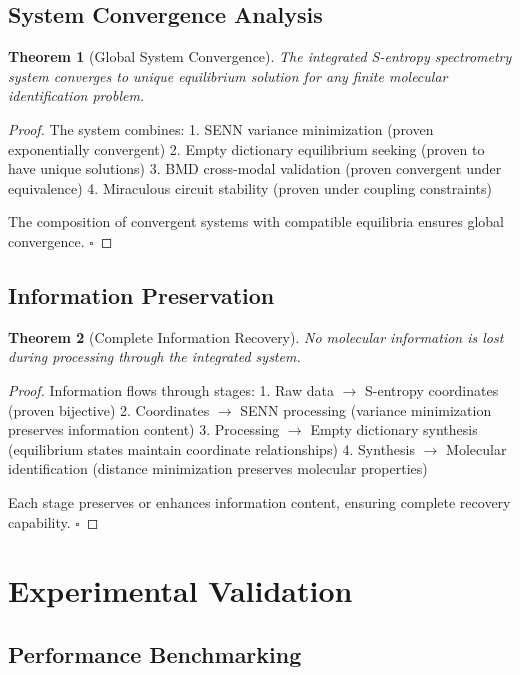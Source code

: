 \documentclass[12pt,a4paper]{article}
\newtheorem{theorem}{Theorem}
\begin{document}
\subsection{System Convergence Analysis}

\begin{theorem}[Global System Convergence]
The integrated S-entropy spectrometry system converges to unique equilibrium solution for any finite molecular identification problem.
\end{theorem}

\begin{proof}
The system combines:
1. SENN variance minimization (proven exponentially convergent)
2. Empty dictionary equilibrium seeking (proven to have unique solutions)
3. BMD cross-modal validation (proven convergent under equivalence)
4. Miraculous circuit stability (proven under coupling constraints)

The composition of convergent systems with compatible equilibria ensures global convergence. $\square$
\end{proof}

\subsection{Information Preservation}

\begin{theorem}[Complete Information Recovery]
No molecular information is lost during processing through the integrated system.
\end{theorem}

\begin{proof}
Information flows through stages:
1. Raw data $\rightarrow$ S-entropy coordinates (proven bijective)
2. Coordinates $\rightarrow$ SENN processing (variance minimization preserves information content)
3. Processing $\rightarrow$ Empty dictionary synthesis (equilibrium states maintain coordinate relationships)
4. Synthesis $\rightarrow$ Molecular identification (distance minimization preserves molecular properties)

Each stage preserves or enhances information content, ensuring complete recovery capability. $\square$
\end{proof}

\section{Experimental Validation}

\subsection{Performance Benchmarking}
\end{document}
